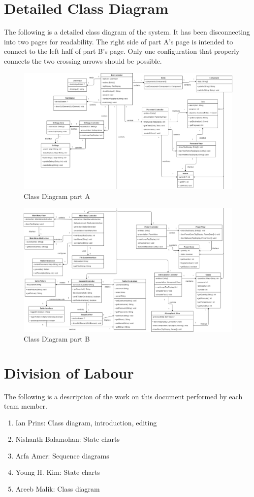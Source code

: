 \documentclass[]{article}
\begin{document}
\section{Detailed Class Diagram}
\label{sec:detailed_class_diagram}
The following is a detailed class diagram of the system. It has been disconnecting into two pages for readability. The right side of part A's page is intended to connect to the left half of part B's page. Only one configuration that properly connects the two crossing arrows should be possible.
\begin{figure}[H]
	\centering
	\includegraphics[width=220mm, angle=90]{ClassDiagramA.png}
	\caption{Class Diagram part A}
\end{figure}
\begin{figure}[H]
	\centering
	\includegraphics[width=220mm, angle=90]{ClassDiagramB.png}
	\caption{Class Diagram part B}
\end{figure}

\appendix
\section{Division of Labour}
\label{sec:division_of_labour}
The following is a description of the work on this document performed by each team member.
\begin{enumerate}
	\item Ian Prins: Class diagram, introduction, editing
	\item Nishanth Balamohan: State charts
	\item Arfa Amer: Sequence diagrams
	\item Young H. Kim: State charts
	\item Areeb Malik: Class diagram
\end{enumerate}
\end{document}
